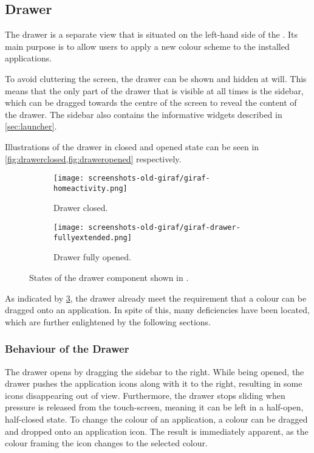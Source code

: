 \subsection{Drawer}\label{sec:launcher:drawer}
The drawer is a separate view that is situated on the left-hand side of the \homeactivity.
Its main purpose is to allow \launcher users to apply a new colour scheme to the installed \giraf applications.

To avoid cluttering the screen, the drawer can be shown and hidden at will.
This means that the only part of the drawer that is visible at all times is the sidebar, which can be dragged towards the centre of the screen to reveal the content of the drawer.
The sidebar also contains the informative widgets described in \cref{sec:launcher}.

Illustrations of the drawer in closed and opened state can be seen in \cref{fig:drawerclosed,fig:draweropened} respectively.

\begin{figure}[h] %
\centering
	\begin{subfigure}[b]{.48\textwidth}
	\centering
	\texttt{[image: screenshots-old-giraf/giraf-homeactivity.png]}
	\caption{Drawer closed.}
	\label{fig:drawerclosed}
	\end{subfigure}
	\hfill
	\begin{subfigure}[b]{.48\textwidth}
	\centering
	\texttt{[image: screenshots-old-giraf/giraf-drawer-fullyextended.png]}
	\caption{Drawer fully opened.}
	\label{fig:draweropened}
	\end{subfigure}
\caption{States of the drawer component shown in \homeactivity.}
\label{fig:drawerstates}
\end{figure}

As indicated by \cref{fig:drawerstates}, the drawer already meet the requirement that a colour can be dragged onto an application.
In spite of this, many deficiencies have been located, which are further enlightened by the following sections.

\subsubsection{Behaviour of the Drawer}\label{sec:drawer:behaviour}
The drawer opens by dragging the sidebar to the right.
While being opened, the drawer pushes the application icons along with it to the right, resulting in some icons disappearing out of view.
Furthermore, the drawer stops sliding when pressure is released from the touch-screen, meaning it can be left in a half-open, half-closed state.
To change the colour of an application, a colour can be dragged and dropped onto an application icon. 
The result is immediately apparent, as the colour framing the icon changes to the selected colour.

